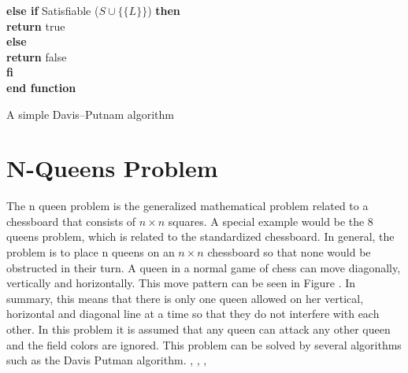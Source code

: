 \begin{listing}[h!]
    \hspace*{0.5cm} \textbf{else if} Satisfiable ($S \cup \{\{L\}\}$) \textbf{then}\\
      \hspace*{1.0cm} \textbf{return} true\\
    \hspace*{0.5cm} \textbf{else}\\
      \hspace*{1.0cm} \textbf{return} false\\
    \hspace*{0.5cm} \textbf{fi}\\
  \textbf{end function}
  \caption{A simple Davis–Putnam algorithm \cite{Zhang2000}}
  \label{code:recursiveDavisPutnam}
\end{listing}  


\section{N-Queens Problem}
\label{sec:sciQueens}
The n queen problem is the generalized mathematical problem related to a chessboard that consists of $n \times n$ squares. A special example would be the 8 queens problem, which is related to the standardized chessboard. In general, the problem is to place n queens on an $n \times n$ chessboard so that none would be obstructed in their turn. A queen in a normal game of chess can move diagonally, vertically and horizontally. This move pattern can be seen in Figure \label{fig:queens-problem}. In summary, this means that there is only one queen allowed on her vertical, horizontal and diagonal line at a time so that they do not interfere with each other. In this problem it is assumed that any queen can attack any other queen and the field colors are ignored. This problem can be solved by several algorithms such as the Davis Putman algorithm. \cite{Bell2009}, \cite{Watkins2012}, \cite[146\psq]{Nudelman1995}, \cite{Stroetman2019}

